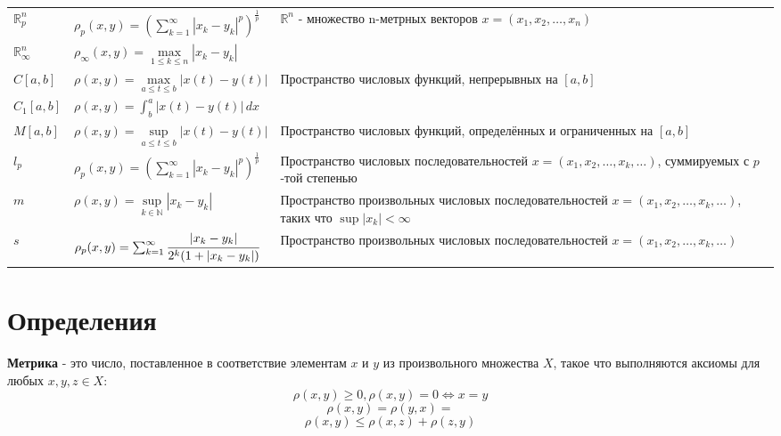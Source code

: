 {\begin{tabular}{||p{2.5cm}|m{6cm}|p{7cm}||}
      $\mathbb{R}^n_p$      & $\rho_p (x,y)=(\sum_{k = 1}^{\infty}|x_k-y_k|^p)^\frac{1}{p}$            & \multirow{2}{6cm}{$\mathbb{R}^n$ - множество n-метрных векторов $x=(x_1,x_2,\dots,x_n)$  }                         \\
      \cline{1-2}
      $\mathbb{R}^n_\infty$ & $\rho_\infty (x,y)=\underset{1\leq k\leq n}{\max}|x_k-y_k|$              &                                                                                                                    \\
      \hline
      $C[a,b]$              & $\rho (x,y)=\underset{a \leq t \leq b}{\max}|x(t)-y(t)|$                 & \multirow{2}{6cm}{Пространство числовых функций, непрерывных на $[a,b]$}                                           \\
      \cline{1-2}
      $C_1[a,b]$            & $\rho (x,y)=\int_{b}^{a}|x(t)-y(t)|\,dx $                                &                                                                                                                    \\[5pt]
      \hline
      $M[a,b]$              & $\rho (x,y)=\underset{a \leq t \leq b}{\sup}|x(t)-y(t)|$                 & Пространство числовых функций, определённых и ограниченных на $[a,b]$                                              \\
      \hline
      $l_p$                 & $\rho_p (x,y)=(\sum_{k = 1}^{\infty}|x_k-y_k|^p)^\frac{1}{p}$            & Пространство числовых последовательностей $x=(x_1,x_2,\dots,x_k,\dots)$, суммируемых с $p$-той степенью            \\
      \hline
      $m$                   & $\rho (x,y)=\underset{k \in \mathbb{N} }{\sup}|x_k-y_k|$                 & Пространство произвольных числовых последовательностей $x=(x_1,x_2,\dots,x_k,\dots)$, таких что $\sup|x_k|<\infty$ \\
      \hline
      $s$                   & $\rho_p (x,y)=\sum_{k = 1}^{\infty} \cfrac{|x_k-y_k|}{2^k(1+|x_k-y_k|)}$ & Пространство произвольных числовых последовательностей $x=(x_1,x_2,\dots,x_k,\dots)$                               \\
      \hline
  \end{tabular}}


\section{Определения}

\textbf{Метрика} - это число, поставленное в соответствие элементам $x$ и $y$ из произвольного множества $X$, такое что выполняются аксиомы для любых $x,y,z\in X$:
\[\rho(x,y)\geq 0,\rho(x,y)=0\Longleftrightarrow x=y\]
\[\rho(x,y)=\rho(y,x)=\]
\[\rho(x,y)\leqslant \rho(x,z)+\rho(z,y)\]

